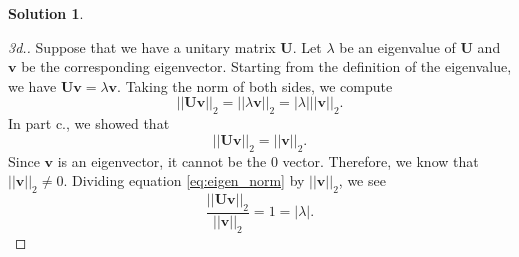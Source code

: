 \documentclass[12pt]{article}
\newcommand{\abs}[1]{ \left| #1 \right| }
\newcommand{\norm}[1]{ \left|\left| #1 \right|\right| }
\renewcommand{\vec}[1]{\mathbf{#1}}
\theoremstyle{definition}
\newtheorem{sol}{Solution}
\theoremstyle{remark}
\begin{document}
\begin{sol}
\begin{proof}[3d.]
    Suppose that we have a unitary matrix $\vec{U}$. Let $\lambda$ be an eigenvalue of $\vec{U}$ and $\vec{v}$ be the corresponding eigenvector. Starting from the definition of the eigenvalue, we have $\vec{Uv} = \lambda \vec{v}$. Taking the norm of both sides, we compute 
    \begin{equation}\label{eq:eigen_norm}
    \norm{\vec{Uv}}_2 = \norm{\lambda\vec{v}}_2 = \abs{\lambda} \norm{\vec{v}}_2.
\end{equation}
In part c., we showed that 
\begin{equation}
    \norm{\vec{Uv}}_2 = \norm{\vec{v}}_2.
\end{equation}
Since $\vec{v}$ is an eigenvector, it cannot be the 0 vector. Therefore, we know that $\norm{\vec{v}}_2 \neq 0$. Dividing equation \ref{eq:eigen_norm} by $\norm{\vec{v}}_2$, we see
\begin{equation}
    \frac{\norm{\vec{Uv}}_2}{\norm{\vec{v}}_2} = 1 = \abs{\lambda}. 
\end{equation}
\end{proof}
\end{sol}
\end{document}
